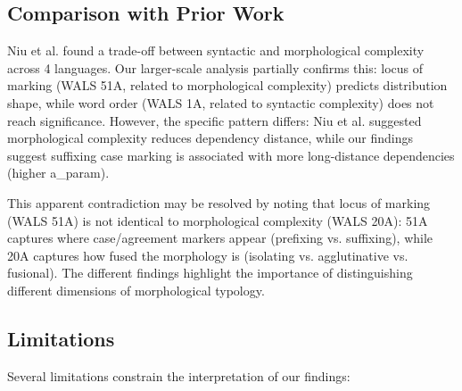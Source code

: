 \documentclass[11pt,letterpaper]{article}
\begin{document}
\subsection{Comparison with Prior Work}

Niu et al. \cite{Niu2023} found a trade-off between syntactic and morphological complexity across 4 languages. Our larger-scale analysis partially confirms this: locus of marking (WALS 51A, related to morphological complexity) predicts distribution shape, while word order (WALS 1A, related to syntactic complexity) does not reach significance. However, the specific pattern differs: Niu et al. suggested morphological complexity reduces dependency distance, while our findings suggest suffixing case marking is associated with more long-distance dependencies (higher a\_param).

This apparent contradiction may be resolved by noting that locus of marking (WALS 51A) is not identical to morphological complexity (WALS 20A): 51A captures where case/agreement markers appear (prefixing vs. suffixing), while 20A captures how fused the morphology is (isolating vs. agglutinative vs. fusional). The different findings highlight the importance of distinguishing different dimensions of morphological typology.

\subsection{Limitations}

Several limitations constrain the interpretation of our findings:
\end{document}
